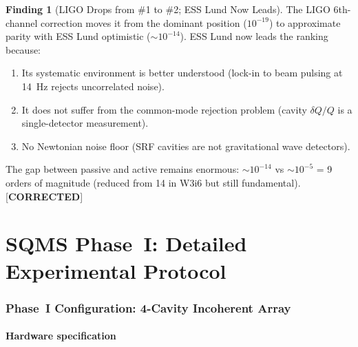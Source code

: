 \documentclass[11pt]{article}
\theoremstyle{definition}
\newtheorem{finding}[theorem]{Finding}
\theoremstyle{remark}
\begin{document}
\begin{finding}[LIGO Drops from \#1 to \#2; ESS Lund Now Leads]
\label{find:ranking_change}
The LIGO 6th-channel correction moves it from the dominant position
($10^{-19}$) to approximate parity with ESS Lund optimistic
($\sim 10^{-14}$). ESS Lund now leads the ranking because:
\begin{enumerate}[nosep]
\item Its systematic environment is better understood (lock-in to
  beam pulsing at 14~Hz rejects uncorrelated noise).
\item It does not suffer from the common-mode rejection problem
  (cavity $\delta Q/Q$ is a single-detector measurement).
\item No Newtonian noise floor (SRF cavities are not gravitational
  wave detectors).
\end{enumerate}

The gap between passive and active remains enormous:
$\sim 10^{-14}$ vs $\sim 10^{-5}$ = 9 orders of magnitude (reduced
from 14 in W3i6 but still fundamental).
[\textbf{CORRECTED}]
\end{finding}


\part{SQMS Phase~I: Detailed Experimental Protocol}
\label{part:SQMS}

\section{Phase~I Configuration: 4-Cavity Incoherent Array}
\label{sec:phase1_config}

\subsection{Hardware specification}
\end{document}
